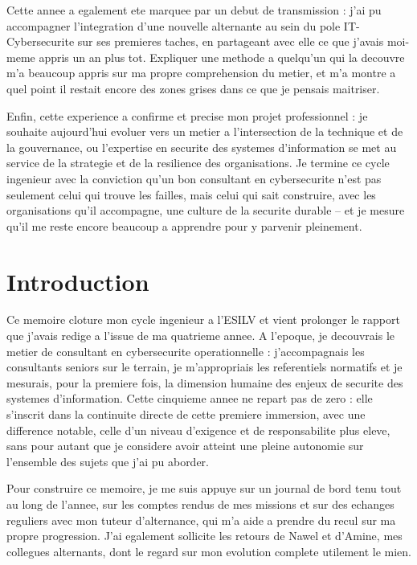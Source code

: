 \documentclass[11pt,a4paper]{article}
\begin{document}
Cette annee a egalement ete marquee par un debut de transmission : j'ai pu accompagner l'integration d'une nouvelle alternante au sein du pole IT-Cybersecurite sur ses premieres taches, en partageant avec elle ce que j'avais moi-meme appris un an plus tot. Expliquer une methode a quelqu'un qui la decouvre m'a beaucoup appris sur ma propre comprehension du metier, et m'a montre a quel point il restait encore des zones grises dans ce que je pensais maitriser.

Enfin, cette experience a confirme et precise mon projet professionnel : je souhaite aujourd'hui evoluer vers un metier a l'intersection de la technique et de la gouvernance, ou l'expertise en securite des systemes d'information se met au service de la strategie et de la resilience des organisations. Je termine ce cycle ingenieur avec la conviction qu'un bon consultant en cybersecurite n'est pas seulement celui qui trouve les failles, mais celui qui sait construire, avec les organisations qu'il accompagne, une culture de la securite durable -- et je mesure qu'il me reste encore beaucoup a apprendre pour y parvenir pleinement.

\newpage

\section*{Introduction}

Ce memoire cloture mon cycle ingenieur a l'ESILV et vient prolonger le rapport que j'avais redige a l'issue de ma quatrieme annee. A l'epoque, je decouvrais le metier de consultant en cybersecurite operationnelle : j'accompagnais les consultants seniors sur le terrain, je m'appropriais les referentiels normatifs et je mesurais, pour la premiere fois, la dimension humaine des enjeux de securite des systemes d'information. Cette cinquieme annee ne repart pas de zero : elle s'inscrit dans la continuite directe de cette premiere immersion, avec une difference notable, celle d'un niveau d'exigence et de responsabilite plus eleve, sans pour autant que je considere avoir atteint une pleine autonomie sur l'ensemble des sujets que j'ai pu aborder.

Pour construire ce memoire, je me suis appuye sur un journal de bord tenu tout au long de l'annee, sur les comptes rendus de mes missions et sur des echanges reguliers avec mon tuteur d'alternance, qui m'a aide a prendre du recul sur ma propre progression. J'ai egalement sollicite les retours de Nawel et d'Amine, mes collegues alternants, dont le regard sur mon evolution complete utilement le mien.
\end{document}
